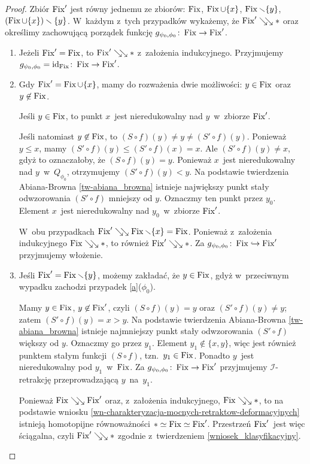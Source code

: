 \begin{proof}
Zbiór $\operatorname{Fix}'$ jest równy jednemu ze zbiorów: $\operatorname{Fix}$, $\operatorname{Fix}\cup\{x\}$, $\operatorname{Fix}\smallsetminus\{y\}$, \mbox{$(\operatorname{Fix}\cup\{x\})\smallsetminus\{y\}$}. W~każdym z~tych przypadków wykażemy, że $\operatorname{Fix}'\searrow\!\!\searrow *$ oraz określimy zachowującą porządek funkcję $g_{\psi_0,\phi_0}\colon \operatorname{Fix}\to \operatorname{Fix}'$.

\begin{enumerate}[I($\phi_0$).]
\item\label{a} Jeżeli $\operatorname{Fix}'=\operatorname{Fix}$, to $\operatorname{Fix}'\searrow\!\!\searrow *$ z~założenia indukcyjnego. Przyjmujemy $g_{\psi_0,\phi_0}=\operatorname{id}_{\operatorname{Fix}}\colon \operatorname{Fix}\to \operatorname{Fix}'$.

\item\label{b} Gdy $\operatorname{Fix}'=\operatorname{Fix}\cup\{x\}$, mamy do rozważenia dwie możliwości: $y\in \operatorname{Fix}$ oraz $y\not\in \operatorname{Fix}$. 

Jeśli $y\in \operatorname{Fix}$, to punkt $x$~jest nieredukowalny nad $y$~w~zbiorze $\operatorname{Fix}'$.

 Jeśli natomiast $y\not\in \operatorname{Fix}$, to $(S\circ f)(y)\not=y\not=(S'\circ f)(y)$. Ponieważ $y\leq x$, mamy $(S'\circ f)(y)\leq (S'\circ f)(x)=x$. Ale $(S'\circ f)(y)\not=x$, gdyż to oznaczałoby, że $(S\circ f)(y)=y$. Ponieważ $x$~jest nieredukowalny nad $y$~w~$Q_{\phi_0}$, otrzymujemy $(S'\circ f)(y)<y$. Na podstawie twierdzenia Abiana-Browna \ref{tw-abiana_browna} istnieje największy punkt stały odwzorowania $(S'\circ f)$ mniejszy od $y$. Oznaczmy ten punkt przez $y_0$. Element $x$~jest nieredukowalny nad $y_0$~w~zbiorze $\operatorname{Fix}'$.

W~obu przypadkach $\operatorname{Fix}'\searrow\!\!\searrow \operatorname{Fix}\smallsetminus\{x\}=\operatorname{Fix}$. Ponieważ z~założenia indukcyjnego $\operatorname{Fix}\searrow\!\!\searrow *$, to również $\operatorname{Fix}'\searrow\!\!\searrow *$. Za \mbox{$g_{\psi_0,\phi_0}\colon \operatorname{Fix}\hookrightarrow \operatorname{Fix}'$} przyjmujemy włożenie.

\item\label{c} Jeśli $\operatorname{Fix}'=\operatorname{Fix}\smallsetminus\{y\}$, możemy zakładać, że $y\in \operatorname{Fix}$, gdyż w~przeciwnym wypadku zachodzi przypadek \ref{a}($\phi_0$).

Mamy $y\in\operatorname{Fix}$, $y\not\in\operatorname{Fix}'$, czyli $(S\circ f)(y)=y$ oraz $(S'\circ f)(y)\not=y$; zatem $(S'\circ f)(y)=x>y$. Na podstawie twierdzenia Abiana-Browna \ref{tw-abiana_browna} istnieje najmniejszy punkt stały odwzorowania $(S'\circ f)$ większy od $y$. Oznaczmy go przez $y_1$. Element $y_1\not\in\{x,y\}$, więc jest również punktem stałym funkcji $(S\circ f)$, tzn.~$y_1\in\operatorname{Fix}$. Ponadto $y$~jest nieredukowalny pod $y_1$~w~$\operatorname{Fix}$. Za $g_{\psi_0,\phi_0}\colon \operatorname{Fix}\to \operatorname{Fix}'$ przyjmujemy $\mathcal{I}$-retrakcję przeprowadzającą $y$~na~$y_1$. 

Ponieważ $\operatorname{Fix}\searrow\!\!\searrow \operatorname{Fix}'$ oraz, z~założenia indukcyjnego, $\operatorname{Fix}\searrow\!\!\searrow *$, to na podstawie wniosku \ref{wn-charakteryzacja-mocnych-retraktow-deformacyjnych} istnieją homotopijne równoważności \mbox{$*\simeq \operatorname{Fix}\simeq \operatorname{Fix}'$}. Przestrzeń $\operatorname{Fix}'$~jest więc ściągalna, czyli $\operatorname{Fix}'\searrow\!\!\searrow *$ zgodnie z~twierdzeniem \ref{wniosek_klasyfikacyjny}.


\end{enumerate}
\end{proof}

